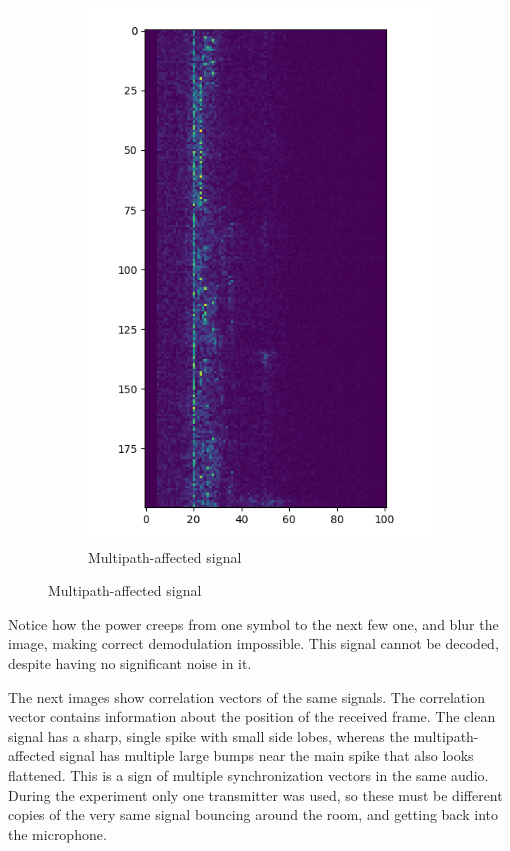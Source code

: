 \documentclass[a4paper]{article}
\begin{document}
\begin{figure}[H]
\begin{subfigure}{0.45\textwidth}
        \includegraphics[width=1\textwidth]{waterfall_sync_multipath.png}
        \caption{Multipath-affected signal}
    \end{subfigure}
\end{figure}

Notice how the power creeps from one symbol to the next few one, and
blur the image, making correct demodulation impossible. This signal
cannot be decoded, despite having no significant noise in it.

The next images show correlation vectors of the same signals. The
correlation vector contains information about the position of the
received frame. The clean signal has a sharp, single spike with small
side lobes, whereas the multipath-affected signal has multiple large
bumps near the main spike that also looks flattened. This is a sign of
multiple synchronization vectors in the same audio. During the
experiment only one transmitter was used, so these must be different
copies of the very same signal bouncing around the room, and getting
back into the microphone.
\end{document}
